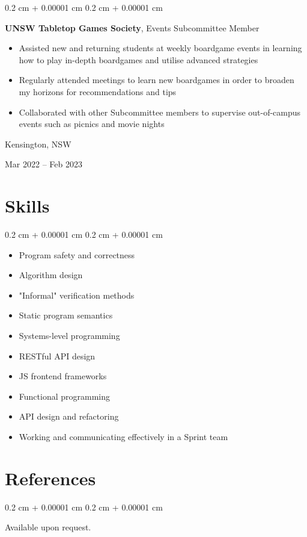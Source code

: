 \documentclass[10pt, a4paper]{article}
\newenvironment{highlights}{
    \begin{itemize}[
        topsep=0.10 cm,
        parsep=0.10 cm,
        partopsep=0pt,
        itemsep=0pt,
        leftmargin=0.4 cm + 10pt
    ]
}{
    \end{itemize}
} %
\newenvironment{highlightsforbulletentries}{
    \begin{itemize}[
        topsep=0.10 cm,
        parsep=0.10 cm,
        partopsep=0pt,
        itemsep=0pt,
        leftmargin=10pt
    ]
}{
    \end{itemize}
} %
\newenvironment{onecolentry}{
    \begin{adjustwidth}{
        0.2 cm + 0.00001 cm
    }{
        0.2 cm + 0.00001 cm
    }
}{
    \end{adjustwidth}
} %
\newenvironment{twocolentry}[2][]{
    \onecolentry
    \def\secondColumn{#2}
    \setcolumnwidth{\fill, 4.5 cm}
    \begin{paracol}{2}
}{
    \switchcolumn \raggedleft \secondColumn
    \end{paracol}
    \endonecolentry
} %
\begin{document}
        
        \begin{twocolentry}{
            Kensington, NSW

        Mar 2022 – Feb 2023
        }
            \textbf{UNSW Tabletop Games Society}, Events Subcommittee Member
            \begin{highlights}
                \item Assisted new and returning students at weekly boardgame events in learning how to play in-depth boardgames and utilise advanced strategies
                \item Regularly attended meetings to learn new boardgames in order to broaden my horizons for recommendations and tips
                \item Collaborated with other Subcommittee members to supervise out-of-campus events such as picnics and movie nights
            \end{highlights}
        \end{twocolentry}



    
    \section{Skills}

    \begin{onecolentry}
        \begin{highlightsforbulletentries}


        \item Program safety and correctness

        \item Algorithm design

        \item "Informal" verification methods

        \item Static program semantics

        \item Systems-level programming

        \item RESTful API design

        \item JS frontend frameworks

        \item Functional programming

        \item API design and refactoring

        \item Working and communicating effectively in a Sprint team


        \end{highlightsforbulletentries}
    \end{onecolentry}

    \section{References}



        
        \begin{onecolentry}
            Available upon request.
        \end{onecolentry}


    
\end{document}
